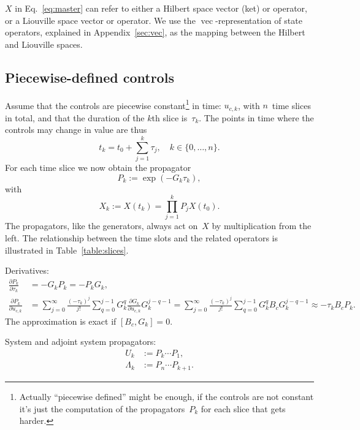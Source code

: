 \documentclass[aps, pra, a4paper, longbibliography]{revtex4}
\newcommand{\be}{\begin{equation}}
\newcommand{\ee}{\end{equation}}
\newcommand{\comm}[2]{\left[ #1, #2 \right]}
\DeclareMathOperator{\cvec}{vec}
\newcommand{\dd}[2]{\frac{\partial #1}{\partial #2}}
\begin{document}
$X$ in Eq.~\eqref{eq:master} can refer to either a Hilbert space
vector (ket) or operator, or a Liouville space vector
or operator.
We use the $\cvec$-representation of state
operators, explained in Appendix~\ref{sec:vec},
as the mapping between the Hilbert and Liouville spaces.

\subsection{Piecewise-defined controls}

Assume that the controls are
piecewise constant\footnote{Actually ``piecewise defined'' might be
  enough, if the controls are not constant it's just the computation
  of the propagators~$P_k$ for each slice that gets harder.}
in time: $u_{c, k}$, with $n$~time slices in total,
and that the duration of the $k$th slice is~$\tau_k$.
The points in time where the controls may change in value are thus
\be
t_k = t_0 + \sum_{j=1}^{k} \tau_j, \quad k \in \{0, \ldots, n\}.
\ee
For each time slice we now obtain the propagator
\be
P_k := \exp(-G_k \tau_k),
\ee
with
\be
\label{eq:Xn}
X_k := X(t_k) = \prod_{j=1}^{k} P_j X(t_0).
\ee
The propagators, like the generators, always act on~$X$ by multiplication
from the left.
The relationship between the time slots and the related operators is
illustrated in Table~\ref{table:slices}.


Derivatives:
\begin{align}
\dd{P_k}{\tau_k}  &= -G_k P_k = -P_k G_k,\\
\dd{P_k}{u_{c,k}}
&=
\sum_{j=0}^{\infty} \frac{(-\tau_k)^j}{j!}
\sum_{q=0}^{j-1}
G_k^{q} \dd{G_k}{u_{c,k}} G_k^{j-q-1}
=
\sum_{j=0}^{\infty} \frac{(-\tau_k)^j}{j!}
\sum_{q=0}^{j-1}
G_k^{q} B_c G_k^{j-q-1}
\approx -\tau_k B_c P_k.
\end{align}
The approximation is exact if $\comm{B_c}{G_k} = 0$.


System and adjoint system propagators:
\begin{align}
U_k &:= P_k \cdots P_1,\\      %
\Lambda_k &:= P_n \cdots P_{k+1}.
\end{align}
\end{document}
